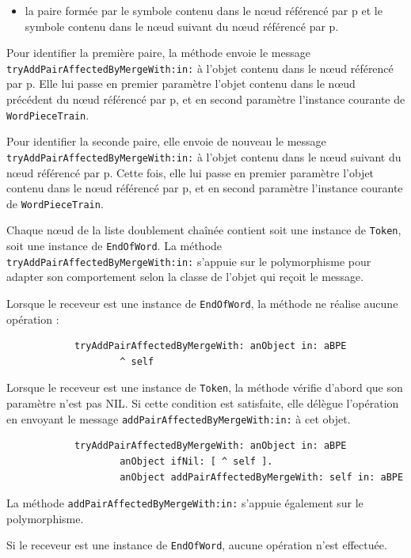 \documentclass[12pt,a4paper]{report}
\begin{document}
\begin{enumerate}
\begin{enumerate}[label=\alph*)]
\begin{itemize}
	 		\item la paire formée par le symbole contenu dans le nœud référencé par p et le symbole contenu dans le nœud suivant du nœud référencé par p.
	 	\end{itemize}
	 	
	 	Pour identifier la première paire, la méthode envoie le message\\
	 	\texttt{tryAddPairAffectedByMergeWith:in:} à l'objet contenu dans le nœud référencé par p. Elle lui passe en premier paramètre l'objet contenu dans le nœud précédent du nœud référencé par p, et en second paramètre l'instance courante de \texttt{ WordPieceTrain}.
	 	
	 	Pour identifier la seconde paire, elle envoie de nouveau le message\\
	 	\texttt{tryAddPairAffectedByMergeWith:in:} à l'objet contenu dans le nœud suivant du nœud référencé par p. Cette fois, elle lui passe en premier paramètre l'objet contenu dans le nœud référencé par p, et en second paramètre l'instance courante de \texttt{WordPieceTrain}.
	 	
	 	Chaque nœud de la liste doublement chaînée contient soit une instance de \texttt{Token}, soit une instance de \texttt{EndOfWord}. La méthode \texttt{tryAddPairAffectedByMergeWith:in:} s'appuie sur le polymorphisme pour adapter son comportement selon la classe de l'objet qui reçoit le message.
	 	
	 	Lorsque le receveur est une instance de \texttt{EndOfWord}, la méthode ne réalise aucune opération :
	 	
	 	\begin{verbatim}
	 		tryAddPairAffectedByMergeWith: anObject in: aBPE
	 				^ self
	 	\end{verbatim}
	 	
	 	Lorsque le receveur est une instance de \texttt{Token}, la méthode vérifie d'abord que son paramètre n'est pas NIL. Si cette condition est satisfaite, elle délègue l'opération en envoyant le message \texttt{addPairAffectedByMergeWith:in:} à cet objet.
	 	
	 	\begin{verbatim}
	 		tryAddPairAffectedByMergeWith: anObject in: aBPE
	 				anObject ifNil: [ ^ self ].
	 				anObject addPairAffectedByMergeWith: self in: aBPE
	 	\end{verbatim}
	 	
	 	La méthode \texttt{addPairAffectedByMergeWith:in:} s'appuie également sur le polymorphisme.
	 	
	 	Si le receveur est une instance de \texttt{EndOfWord}, aucune opération n'est effectuée.
	 	

\end{enumerate}
\end{enumerate}
\end{document}
